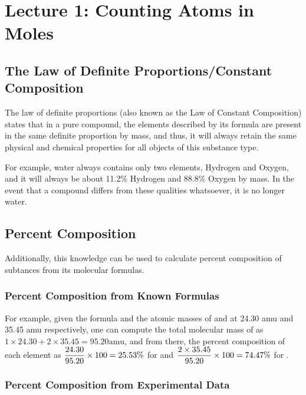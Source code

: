 \section{Lecture 1: Counting Atoms in Moles}

\subsection{The Law of Definite Proportions/Constant Composition}

\begin{defn}
The law of definite proportions (also known as the Law of Constant Composition) states that in a pure compound, the elements described by its formula are present in the same definite proportion by mass, and thus, it will always retain the same physical and chemical properties for all objects of this substance type.
\end{defn}

\noindent
For example, water always contains only two elements, Hydrogen and Oxygen, and it will always be about 11.2\% Hydrogen and 88.8\% Oxygen by mass. In the event that a compound differs from these qualities whatsoever, it is no longer water.

\subsection{Percent Composition}

Additionally, this knowledge can be used to calculate percent composition of subtances from its molecular formulas.

\subsubsection{Percent Composition from Known Formulas}

\begin{example}
For example, given the formula  and the atomic masses of  and  at 24.30 amu and 35.45 amu respectively, one can compute the total molecular mass of  as $1 \times 24.30 + 2 \times 35.45 = 95.20 \mathrm{amu}$, and from there, the percent composition of each element as $\displaystyle \frac{24.30}{95.20} \times 100 = 25.53\%$ for  and $\displaystyle \frac{2 \times 35.45}{95.20} \times 100 = 74.47\%$ for .
\end{example}

\subsubsection{Percent Composition from Experimental Data}

